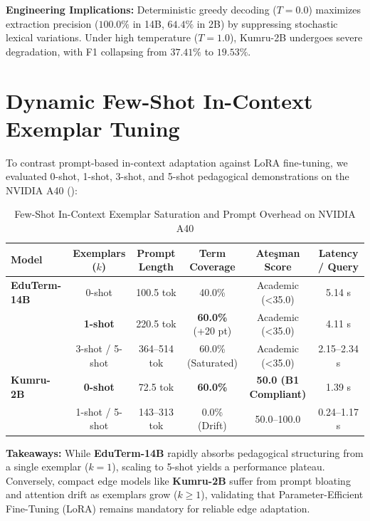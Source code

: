 \documentclass[a4paper,12pt]{report}
\begin{document}
\textbf{Engineering Implications:} Deterministic greedy decoding ($T=0.0$) maximizes extraction precision ($100.0\%$ in 14B, $64.4\%$ in 2B) by suppressing stochastic lexical variations. Under high temperature ($T=1.0$), Kumru-2B undergoes severe degradation, with F1 collapsing from $37.41\%$ to $19.53\%$.

\section{Dynamic Few-Shot In-Context Exemplar Tuning}
\label{sec:few_shot_tuning}
To contrast prompt-based in-context adaptation against LoRA fine-tuning, we evaluated 0-shot, 1-shot, 3-shot, and 5-shot pedagogical demonstrations on the NVIDIA A40 ():

\begin{table}[htbp]
\centering
\small
\caption{Few-Shot In-Context Exemplar Saturation and Prompt Overhead on NVIDIA A40}
\label{tab:few_shot_tuning}
\scriptsize\setlength{\tabcolsep}{2pt}
\begin{tabularx}{\textwidth}{>{\RaggedRight\arraybackslash}Xccccc}
\hline
\textbf{Model} & \textbf{Exemplars ($k$)} & \textbf{Prompt Length} & \textbf{Term Coverage} & \textbf{Ateşman Score} & \textbf{Latency / Query} \\
\hline
\textbf{EduTerm-14B} & 0-shot & 100.5 tok & 40.0\% & Academic (<35.0) & 5.14 s \\
& \textbf{1-shot} & 220.5 tok & \textbf{60.0\%} (+20 pt) & Academic (<35.0) & 4.11 s \\
& 3-shot / 5-shot & 364--514 tok & 60.0\% (Saturated) & Academic (<35.0) & 2.15--2.34 s \\
\hline
\textbf{Kumru-2B} & \textbf{0-shot} & 72.5 tok & \textbf{60.0\%} & \textbf{50.0 (B1 Compliant)} & 1.39 s \\
& 1-shot / 5-shot & 143--313 tok & 0.0\% (Drift) & 50.0--100.0 & 0.24--1.17 s \\
\hline
\end{tabularx}
\end{table}

\textbf{Takeaways:} While \textbf{EduTerm-14B} rapidly absorbs pedagogical structuring from a single exemplar ($k=1$), scaling to 5-shot yields a performance plateau. Conversely, compact edge models like \textbf{Kumru-2B} suffer from prompt bloating and attention drift as exemplars grow ($k \ge 1$), validating that Parameter-Efficient Fine-Tuning (LoRA) remains mandatory for reliable edge adaptation.
\end{document}
